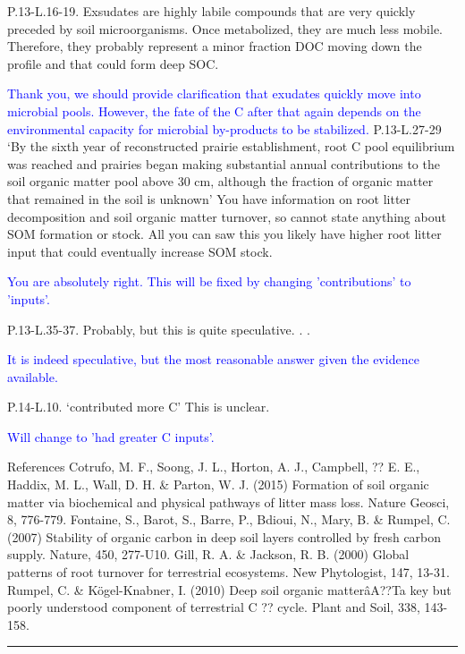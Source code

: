 \documentclass[]{article}
\begin{document}
P.13-L.16-19. Exsudates are highly labile compounds that are very
quickly preceded by soil microorganisms. Once metabolized, they are much
less mobile. Therefore, they probably represent a minor fraction DOC
moving down the profile and that could form deep SOC.

\textcolor{blue}{Thank you, we should provide clarification that exudates quickly move into microbial pools. However, the fate of the C after that again depends on the environmental capacity for microbial by-products to be stabilized.}
P.13-L.27-29 `By the sixth year of reconstructed prairie establishment,
root C pool equilibrium was reached and prairies began making
substantial annual contributions to the soil organic matter pool above
30 cm, although the fraction of organic matter that remained in the soil
is unknown' You have information on root litter decomposition and soil
organic matter turnover, so cannot state anything about SOM formation or
stock. All you can saw this you likely have higher root litter input
that could eventually increase SOM stock.

\textcolor{blue}{You are absolutely right. This will be fixed by changing 'contributions' to 'inputs'.}

P.13-L.35-37. Probably, but this is quite speculative. . .

\textcolor{blue}{It is indeed speculative, but the most reasonable answer given the evidence available.}

P.14-L.10. `contributed more C' This is unclear.

\textcolor{blue}{Will change to 'had greater C inputs'.}

References Cotrufo, M. F., Soong, J. L., Horton, A. J., Campbell, ?? E.
E., Haddix, M. L., Wall, D. H. \& Parton, W. J. (2015) Formation of soil
organic matter via biochemical and physical pathways of litter mass
loss. Nature Geosci, 8, 776-779. Fontaine, S., Barot, S., Barre, P.,
Bdioui, N., Mary, B. \& Rumpel, C. (2007) Stability of organic carbon in
deep soil layers controlled by fresh carbon supply. Nature, 450,
277-U10. Gill, R. A. \& Jackson, R. B. (2000) Global patterns of root
turnover for terrestrial ecosystems. New Phytologist, 147, 13-31.
Rumpel, C. \& Kögel-Knabner, I. (2010) Deep soil organic matterâA??Ta
key but poorly understood component of terrestrial C ?? cycle. Plant and
Soil, 338, 143-158.

\begin{center}\rule{0.5\linewidth}{\linethickness}\end{center}
\end{document}
